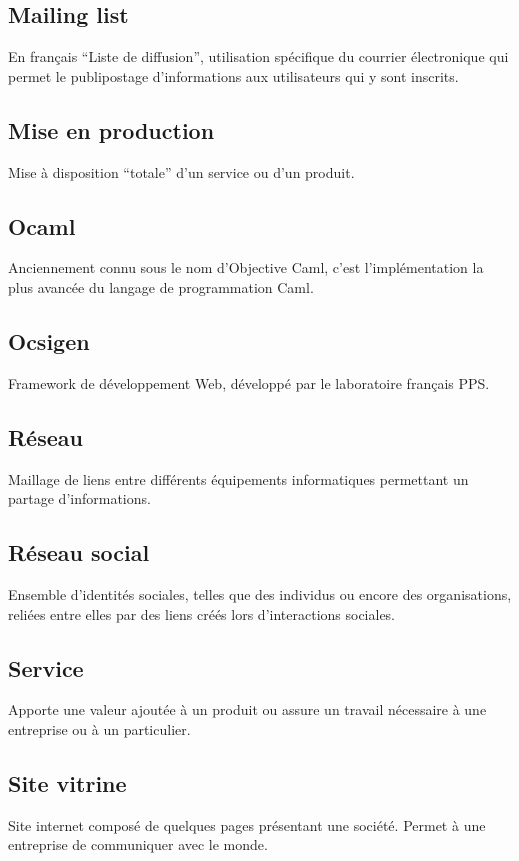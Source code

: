 \documentclass{life-fr}
\begin{document}
\subsection{ Mailing list}
En français ``Liste de diffusion'', utilisation spécifique du courrier électronique qui permet le publipostage d'informations aux utilisateurs qui y sont inscrits.

\subsection{ Mise en production}
Mise à disposition ``totale'' d’un service ou d’un produit.

\subsection{ Ocaml}
Anciennement connu sous le nom d'Objective Caml, c’est l'implémentation la plus avancée du langage de programmation Caml.

\subsection{ Ocsigen}
Framework de développement Web, développé par le laboratoire français PPS.

\subsection{ Réseau}
Maillage de liens entre différents équipements informatiques permettant un partage d’informations.

\subsection{ Réseau social}
Ensemble d'identités sociales, telles que des individus ou encore des organisations, reliées entre elles par des liens créés lors d’interactions sociales.

\subsection{ Service}
Apporte une valeur ajoutée à un produit ou assure un travail nécessaire à une entreprise ou à un particulier.

\subsection{ Site vitrine}
Site internet composé de quelques pages présentant une société. Permet à une entreprise de communiquer avec le monde.
\end{document}
